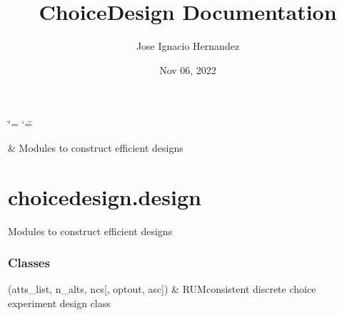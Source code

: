 \documentclass[a4paper,10pt,english]{sphinxhowto}
\title{ChoiceDesign Documentation}
\date{Nov 06, 2022}
\author{Jose Ignacio Hernandez}
\begin{document}
\ifdefined\shorthandoff
  \ifnum\catcode`\=\string=\active\shorthandoff{=}\fi
  \ifnum\catcode`\"=\active{}\fi
\fi

\pagestyle{empty}
\sphinxmaketitle
\pagestyle{plain}
\sphinxtableofcontents
\pagestyle{normal}
\label{\detokenize{index::doc}}



\begin{savenotes}\sphinxattablestart
\sphinxthistablewithglobalstyle
\sphinxthistablewithnovlinesstyle
\centering
\begin{tabulary}{\linewidth}[t]{}
\sphinxtoprule
\sphinxtableatstartofbodyhook
\sphinxAtStartPar
{\hyperref[\detokenize{generated/choicedesign.design:module-choicedesign.design}]{}}
&
\sphinxAtStartPar
Modules to construct efficient designs
\\
\sphinxbottomrule
\end{tabulary}
\sphinxtableafterendhook\par
\sphinxattableend\end{savenotes}

\sphinxstepscope


\section{choicedesign.design}
\label{\detokenize{generated/choicedesign.design:module-choicedesign.design}}\label{\detokenize{generated/choicedesign.design:choicedesign-design}}\label{\detokenize{generated/choicedesign.design::doc}}
\sphinxAtStartPar
Modules to construct efficient designs
\subsubsection*{Classes}


\begin{savenotes}\sphinxattablestart
\sphinxthistablewithglobalstyle
\sphinxthistablewithnovlinesstyle
\centering
\begin{tabulary}{\linewidth}[t]{}
\sphinxtoprule
\sphinxtableatstartofbodyhook
\sphinxAtStartPar
{\hyperref[\detokenize{generated/choicedesign.design:choicedesign.design.RUMDesign}]{}}(atts\_list, n\_alts, ncs{[}, optout, asc{]})
&
\sphinxAtStartPar
RUM\sphinxhyphen{}consistent discrete choice experiment design class
\\
\sphinxbottomrule
\end{tabulary}
\sphinxtableafterendhook\par
\sphinxattableend\end{savenotes}
\end{document}
